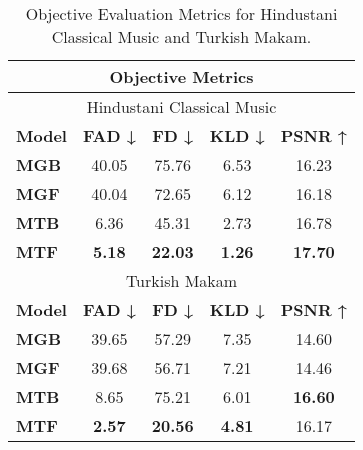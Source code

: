 \begin{table}[!t]
\centering
\small %
\setlength{\tabcolsep}{10pt} %
\begin{tabular}{lcccc}
\toprule
\multicolumn{5}{c}{\textbf{Objective Metrics}} \\ \midrule
\multicolumn{5}{c}{Hindustani Classical Music} \\ \midrule
\textbf{Model} & \textbf{FAD ↓} & \textbf{FD ↓} & \textbf{KLD ↓} & \textbf{PSNR ↑} \\ \midrule
\textbf{MGB} & 40.05 & 75.76 & 6.53 & 16.23 \\
\textbf{MGF} & 40.04 & 72.65 & 6.12 & 16.18 \\
\textbf{MTB} & 6.36 & 45.31 & 2.73 & 16.78 \\
\textbf{MTF} & \textbf{5.18} & \textbf{22.03} & \textbf{1.26} & \textbf{17.70}\\ \midrule

\multicolumn{5}{c}{Turkish Makam} \\ \midrule
\textbf{Model} & \textbf{FAD ↓} & \textbf{FD ↓} & \textbf{KLD ↓} & \textbf{PSNR ↑} \\ \midrule
\textbf{MGB} & 39.65 & 57.29 & 7.35 & 14.60 \\
\textbf{MGF} & 39.68 & 56.71 & 7.21 & 14.46 \\
\textbf{MTB} & 8.65 & 75.21 & 6.01 & \textbf{16.60} \\
\textbf{MTF} & \textbf{2.57} & \textbf{20.56} & \textbf{4.81} & 16.17\\ 
\bottomrule
\end{tabular}
\caption{Objective Evaluation Metrics for Hindustani Classical Music and Turkish Makam.}
\label{tab:objective_model_metrics}
\end{table}
